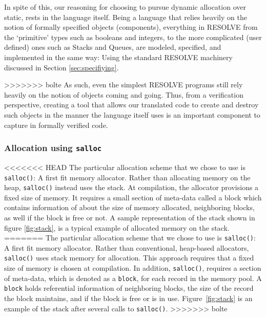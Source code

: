 
In spite of this, our reasoning for choosing to pursue dynamic allocation over static, rests in the language itself. Being a language that relies heavily on the notion of formally specified objects (components), everything in RESOLVE from the `primitive' types such as booleans and integers, to the more complicated (user defined) ones such as Stacks and Queues, are modeled, specified, and implemented in the same way: Using the standard RESOLVE machinery discussed in Section \ref{sec:specifiying}. 

>>>>>>> bolte
As such, even the simplest RESOLVE programs still rely heavily on the notion of objects coming and going. Thus, from a verification perspective, creating a tool that allows our translated code to create and destroy such objects in the manner the language itself uses is an important component to capture in formally verified code.

\subsubsection{Allocation using \texttt{salloc}}

<<<<<<< HEAD
The particular allocation scheme that we chose to use is \texttt{salloc()}: A first fit memory allocator. Rather than allocating memory on the heap, \texttt{salloc()} instead uses the stack. At compilation, the allocator provisions a fixed size of memory. It requires a small section of meta-data called a block which contains information of about the size of memory allocated, neighboring blocks, as well if the block is free or not. A sample representation of the stack shown in figure \ref{fig:stack}, is a typical example of allocated memory on the stack.
=======
The particular allocation scheme that we chose to use is \texttt{salloc()}: A first fit memory allocator. Rather than conventional, heap-based allocators, \texttt{salloc()} uses stack memory for allocation. This approach requires that a fixed size of memory is chosen at compilation. In addition, \texttt{salloc()}, requires a section of meta-data, which is denoted as a \texttt{block}, for each record in the memory pool. A \texttt{block} holds referential information of neighboring blocks, the size of the record the block maintains, and if the block is free or is in use. Figure~\ref{fig:stack} is an example of the stack after several calls to \texttt{salloc()}.
>>>>>>> bolte

